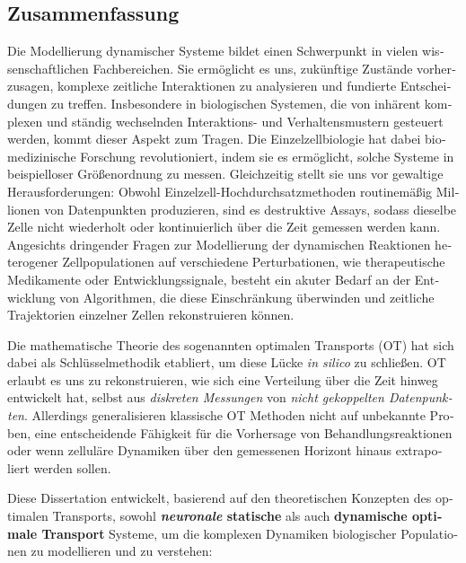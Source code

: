 \cleardoublepage%

\begingroup
\let\clearpage\relax
\let\cleardoublepage\relax
\let\cleardoublepage\relax

\begin{otherlanguage}{ngerman}
\chapter*{Zusammenfassung}

Die Modellierung dynamischer Systeme bildet einen Schwerpunkt in vielen wissenschaftlichen Fachbereichen. Sie erm{\"o}glicht es uns, zuk{\"u}nftige Zust{\"a}nde vorherzusagen, komplexe zeitliche Interaktionen zu analysieren und fundierte Entscheidungen zu treffen. Insbesondere in biologischen Systemen, die von inh{\"a}rent komplexen und st{\"a}ndig wechselnden Interaktions- und Verhaltensmustern gesteuert werden, kommt dieser Aspekt zum Tragen.
Die Einzelzellbiologie hat dabei biomedizinische Forschung revolutioniert, indem sie es erm{\"o}glicht, solche Systeme in beispielloser Gr{\"o}{\ss}enordnung zu messen. Gleichzeitig stellt sie uns vor gewaltige Herausforderungen: Obwohl Einzelzell-Hochdurchsatzmethoden routinem{\"a}{\ss}ig Millionen von Datenpunkten produzieren, sind es destruktive Assays, sodass dieselbe Zelle nicht wiederholt oder kontinuierlich {\"u}ber die Zeit gemessen werden kann.
Angesichts dringender Fragen zur Modellierung der dynamischen Reaktionen heterogener Zellpopulationen auf verschiedene Perturbationen, wie therapeutische Medikamente oder Entwicklungssignale, besteht ein akuter Bedarf an der Entwicklung von Algorithmen, die diese Einschr{\"a}nkung {\"u}berwinden und zeitliche Trajektorien einzelner Zellen rekonstruieren k{\"o}nnen.

Die mathematische Theorie des sogenannten optimalen Transports (OT) hat sich dabei als Schl{\"u}sselmethodik etabliert, um diese L{\"u}cke \emph{in silico} zu schlie{\ss}en. OT erlaubt es uns zu rekonstruieren, wie sich eine Verteilung {\"u}ber die Zeit hinweg entwickelt hat, selbst aus \textit{diskreten Messungen} von \textit{nicht gekoppelten Datenpunkten}. Allerdings generalisieren klassische OT Methoden nicht auf unbekannte Proben, eine entscheidende F{\"a}higkeit f{\"u}r die Vorhersage von Behandlungsreaktionen oder wenn zellul{\"a}re Dynamiken {\"u}ber den gemessenen Horizont hinaus extrapoliert werden sollen.

Diese Dissertation entwickelt, basierend auf den theoretischen Konzepten des optimalen Transports, sowohl \textbf{\textit{neuronale} statische} als auch \textbf{dynamische optimale Transport} Systeme, um die komplexen Dynamiken biologischer Populationen zu modellieren und zu verstehen:


\end{otherlanguage}
